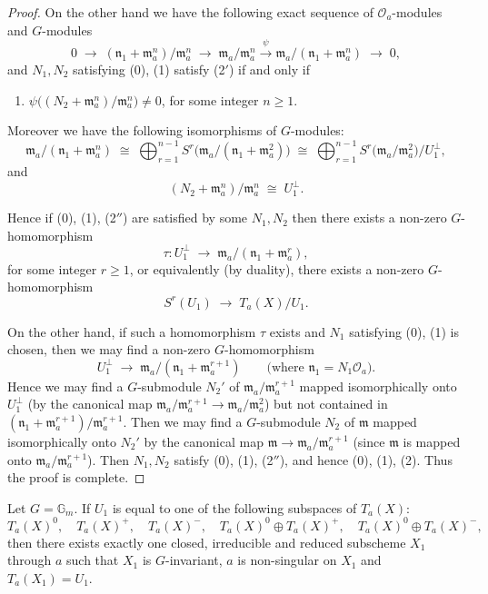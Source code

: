 \documentclass[12pt]{article}
\begin{document}
\begin{proof}
On the other hand we have the following exact sequence of 
$\mathcal O_a$-modules and $G$-modules
\[
0 \;\longrightarrow\; (\mathfrak n_1 + \mathfrak m_a^n)/\mathfrak m_a^n
   \;\longrightarrow\; \mathfrak m_a/\mathfrak m_a^n 
   \xrightarrow{\;\psi\;} \mathfrak m_a/(\mathfrak n_1 + \mathfrak m_a^n)
   \;\longrightarrow\; 0,
\]
and $N_1,N_2$ satisfying (0), (1) satisfy (2$'$) if and only if
\begin{enumerate}[(2$''$)]
   \item $\psi\big( (N_2+\mathfrak m_a^n)/\mathfrak m_a^n \big) \neq 0$,
   for some integer $n \ge 1$.
\end{enumerate}

Moreover we have the following isomorphisms of $G$-modules:
\[
   \mathfrak m_a/(\mathfrak n_1 + \mathfrak m_a^n) 
   \;\cong\; \bigoplus_{r=1}^{n-1} S^r\!\big(\mathfrak m_a/(\mathfrak n_1 + \mathfrak m_a^2)\big)
   \;\cong\; \bigoplus_{r=1}^{n-1} S^r\!\big(\mathfrak m_a/\mathfrak m_a^2\big) / U_1^\perp,
\]
and
\[
   (N_2+\mathfrak m_a^n)/\mathfrak m_a^n \;\cong\; U_1^\perp.
\]

Hence if (0), (1), (2$''$) are satisfied by some $N_1, N_2$ then there exists a 
non-zero $G$-homomorphism
\[
   \tau : U_1^\perp \;\longrightarrow\; \mathfrak m_a/(\mathfrak n_1 + \mathfrak m_a^r),
\]
for some integer $r \ge 1$, or equivalently (by duality), there exists a 
non-zero $G$-homomorphism
\[
   S^r(U_1) \;\longrightarrow\; T_a(X)/U_1.
\]

On the other hand, if such a homomorphism $\tau$ exists and $N_1$ satisfying 
(0), (1) is chosen, then we may find a non-zero $G$-homomorphism
\[
   U_1^\perp \;\longrightarrow\; \mathfrak m_a/(\mathfrak n_1 + \mathfrak m_a^{r+1})
   \qquad \text{(where $\mathfrak n_1 = N_1 \mathcal O_a$).}
\]
Hence we may find a $G$-submodule $N_2'$ of $\mathfrak m_a/\mathfrak m_a^{r+1}$ 
mapped isomorphically onto $U_1^\perp$ (by the canonical map 
$\mathfrak m_a/\mathfrak m_a^{r+1} \to \mathfrak m_a/\mathfrak m_a^2$) but not 
contained in $(\mathfrak n_1 + \mathfrak m_a^{r+1})/\mathfrak m_a^{r+1}$.  
Then we may find a $G$-submodule $N_2$ of $\mathfrak m$ mapped isomorphically 
onto $N_2'$ by the canonical map $\mathfrak m \to \mathfrak m_a/\mathfrak m_a^{r+1}$ 
(since $\mathfrak m$ is mapped onto $\mathfrak m_a/\mathfrak m_a^{r+1}$).  
Then $N_1, N_2$ satisfy (0), (1), (2$''$), and hence (0), (1), (2).  
Thus the proof is complete.
\end{proof}

\begin{corollary}
Let $G = \mathbb{G}_m$. If $U_1$ is equal to one of the following 
subspaces of $T_a(X)$: 
\[
   T_a(X)^0, \quad T_a(X)^+, \quad T_a(X)^-, \quad 
   T_a(X)^0 \oplus T_a(X)^+, \quad T_a(X)^0 \oplus T_a(X)^-,
\]
then there exists exactly one closed, irreducible and reduced subscheme 
$X_1$ through $a$ such that $X_1$ is $G$-invariant, $a$ is non-singular 
on $X_1$ and $T_a(X_1) = U_1$.
\end{corollary}
\end{document}
